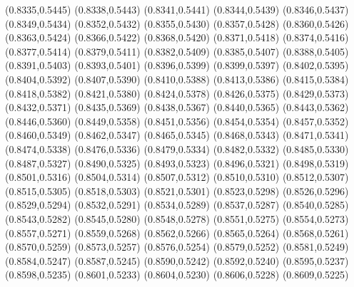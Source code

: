 \PST@Cross(0.8335,0.5445)
\PST@Cross(0.8338,0.5443)
\PST@Cross(0.8341,0.5441)
\PST@Cross(0.8344,0.5439)
\PST@Cross(0.8346,0.5437)
\PST@Cross(0.8349,0.5434)
\PST@Cross(0.8352,0.5432)
\PST@Cross(0.8355,0.5430)
\PST@Cross(0.8357,0.5428)
\PST@Cross(0.8360,0.5426)
\PST@Cross(0.8363,0.5424)
\PST@Cross(0.8366,0.5422)
\PST@Cross(0.8368,0.5420)
\PST@Cross(0.8371,0.5418)
\PST@Cross(0.8374,0.5416)
\PST@Cross(0.8377,0.5414)
\PST@Cross(0.8379,0.5411)
\PST@Cross(0.8382,0.5409)
\PST@Cross(0.8385,0.5407)
\PST@Cross(0.8388,0.5405)
\PST@Cross(0.8391,0.5403)
\PST@Cross(0.8393,0.5401)
\PST@Cross(0.8396,0.5399)
\PST@Cross(0.8399,0.5397)
\PST@Cross(0.8402,0.5395)
\PST@Cross(0.8404,0.5392)
\PST@Cross(0.8407,0.5390)
\PST@Cross(0.8410,0.5388)
\PST@Cross(0.8413,0.5386)
\PST@Cross(0.8415,0.5384)
\PST@Cross(0.8418,0.5382)
\PST@Cross(0.8421,0.5380)
\PST@Cross(0.8424,0.5378)
\PST@Cross(0.8426,0.5375)
\PST@Cross(0.8429,0.5373)
\PST@Cross(0.8432,0.5371)
\PST@Cross(0.8435,0.5369)
\PST@Cross(0.8438,0.5367)
\PST@Cross(0.8440,0.5365)
\PST@Cross(0.8443,0.5362)
\PST@Cross(0.8446,0.5360)
\PST@Cross(0.8449,0.5358)
\PST@Cross(0.8451,0.5356)
\PST@Cross(0.8454,0.5354)
\PST@Cross(0.8457,0.5352)
\PST@Cross(0.8460,0.5349)
\PST@Cross(0.8462,0.5347)
\PST@Cross(0.8465,0.5345)
\PST@Cross(0.8468,0.5343)
\PST@Cross(0.8471,0.5341)
\PST@Cross(0.8474,0.5338)
\PST@Cross(0.8476,0.5336)
\PST@Cross(0.8479,0.5334)
\PST@Cross(0.8482,0.5332)
\PST@Cross(0.8485,0.5330)
\PST@Cross(0.8487,0.5327)
\PST@Cross(0.8490,0.5325)
\PST@Cross(0.8493,0.5323)
\PST@Cross(0.8496,0.5321)
\PST@Cross(0.8498,0.5319)
\PST@Cross(0.8501,0.5316)
\PST@Cross(0.8504,0.5314)
\PST@Cross(0.8507,0.5312)
\PST@Cross(0.8510,0.5310)
\PST@Cross(0.8512,0.5307)
\PST@Cross(0.8515,0.5305)
\PST@Cross(0.8518,0.5303)
\PST@Cross(0.8521,0.5301)
\PST@Cross(0.8523,0.5298)
\PST@Cross(0.8526,0.5296)
\PST@Cross(0.8529,0.5294)
\PST@Cross(0.8532,0.5291)
\PST@Cross(0.8534,0.5289)
\PST@Cross(0.8537,0.5287)
\PST@Cross(0.8540,0.5285)
\PST@Cross(0.8543,0.5282)
\PST@Cross(0.8545,0.5280)
\PST@Cross(0.8548,0.5278)
\PST@Cross(0.8551,0.5275)
\PST@Cross(0.8554,0.5273)
\PST@Cross(0.8557,0.5271)
\PST@Cross(0.8559,0.5268)
\PST@Cross(0.8562,0.5266)
\PST@Cross(0.8565,0.5264)
\PST@Cross(0.8568,0.5261)
\PST@Cross(0.8570,0.5259)
\PST@Cross(0.8573,0.5257)
\PST@Cross(0.8576,0.5254)
\PST@Cross(0.8579,0.5252)
\PST@Cross(0.8581,0.5249)
\PST@Cross(0.8584,0.5247)
\PST@Cross(0.8587,0.5245)
\PST@Cross(0.8590,0.5242)
\PST@Cross(0.8592,0.5240)
\PST@Cross(0.8595,0.5237)
\PST@Cross(0.8598,0.5235)
\PST@Cross(0.8601,0.5233)
\PST@Cross(0.8604,0.5230)
\PST@Cross(0.8606,0.5228)
\PST@Cross(0.8609,0.5225)
